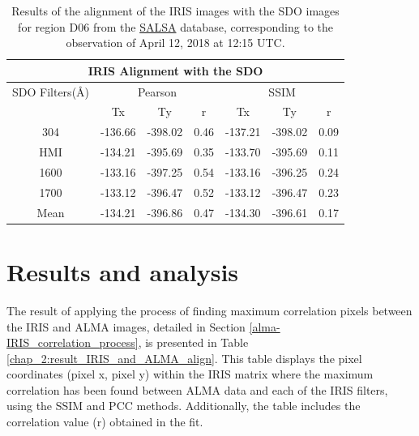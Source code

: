 \documentclass[a4paper,alpha-refs]{eSpectra}
\begin{document}
\begin{table}[!htp]
\centering
\begin{tabular}{ccccccc}
\toprule
\toprule
\multicolumn{7}{c}{IRIS Alignment with the SDO} \\ 
\midrule
\multicolumn{1}{c}{SDO Filters(Å)} & \multicolumn{3}{c}{Pearson} & \multicolumn{3}{c}{SSIM} \\ 
\cmidrule(lr){2-4} \cmidrule(lr){5-7}
& Tx & Ty & r & Tx & Ty & r \\
\midrule
304 & -136.66 & -398.02 & 0.46 & -137.21 & -398.02 & 0.09 \\
HMI & -134.21 & -395.69 & 0.35 & -133.70 & -395.69 & 0.11 \\
1600 & -133.16 & -397.25 & 0.54 & -133.16 & -396.25 & 0.24 \\
1700 & -133.12 & -396.47 & 0.52 & -133.12 & -396.47 & 0.23 \\
Mean & -134.21 & -396.86 & 0.47 & -134.30 & -396.61 & 0.17 \\
\bottomrule
\end{tabular}
\caption{Results of the alignment of the IRIS images with the SDO images for region D06 from the \href{http://sdc.uio.no/salsa/}{SALSA} database, corresponding to the observation of April 12, 2018 at 12:15 UTC.}
\label{chap_2:result_IRIS_and_SDO_align}
\end{table}



\section{Results and analysis}


The result of applying the process of finding maximum correlation pixels between the IRIS and ALMA images,  detailed in Section \ref{alma-IRIS_correlation_process}, is presented in Table \ref{chap_2:result_IRIS_and_ALMA_align}.
This table displays the pixel coordinates (pixel x, pixel y) within the IRIS matrix where the maximum correlation has been found between ALMA data and each of the IRIS filters, using the SSIM and PCC methods. Additionally, the table includes the correlation value (r) obtained in the fit.

\end{document}
